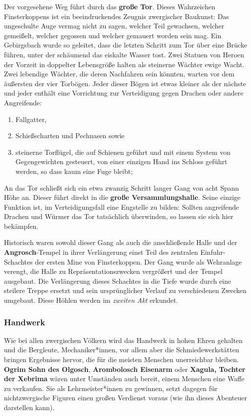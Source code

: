Der vorgesehene Weg führt durch das \textbf{große Tor}.
Dieses Wahrzeichen Finsterkoppens ist ein beeindruckendes Zeugnis zwergischer Baukunst:
Das ungeschulte Auge vermag nicht zu sagen, welcher Teil gewachsen, welcher gemeißelt, welcher gegossen und welcher gemauert worden sein mag.
Ein Gebirgsbach wurde so geleitet, dass die letzten Schritt zum Tor über eine Brücke führen, unter der schäumend das eiskalte Wasser tost.
Zwei Statuen von Heroen der Vorzeit in doppelter Lebensgröße halten als steinerne Wächter ewige Wacht.
Zwei lebendige Wächter, die deren Nachfahren sein könnten, warten vor dem äußersten der vier Torbögen.
Jeder dieser Bögen ist etwas kleiner als der nächste und  jeder enthält eine Vorrichtung zur Verteidigung gegen Drachen oder andere Angreifende:
\begin{enumerate}\setlength\itemsep {0em}
	\item Fallgatter,
	\item Schießscharten und Pechnasen sowie
	\item steinerne Torflügel, die auf Schienen geführt und mit einem System von Gegengewichten gesteuert, von einer einzigen Hand ins Schloss geführt werden, so dass kaum eine Fuge bleibt;
\end{enumerate}

An das Tor schließt sich ein etwa zwanzig Schritt langer Gang von acht Spann Höhe an.
Dieser führt direkt in die \textbf{große Versammlungshalle}.
Seine einzige Funktion ist, im Verteidigungsfall eine Engstelle zu bilden:
Sollten angreifende Drachen und Würmer das Tor tatsächlich überwinden, so lassen sie sich hier bekämpfen.

Historisch waren sowohl dieser Gang als auch die anschließende Halle und der \textbf{Angrosch}-Tempel in ihrer Verlängerung einst Teil des zentralen Einfuhr-Schachtes der ersten Mine von Finsterkoppen.
Der Gang wurde als Wehranlage verengt, die Halle zu Repräsentationszwecken vergrößert und der Tempel ausgebaut. 
Die Verlängerung dieses Schachtes in die Tiefe wurde durch eine steilere Treppe ersetzt und sein ursprünglicher Verlauf zu verschiedenen Zwecken umgebaut. Diese Höhlen werden im \emph{zweiten Akt} erkundet.

\subsubsection{Handwerk}
Wie bei allen zwergischen Völkern wird das Handwerk in hohen Ehren gehalten und die Bergleute, Mechaniker*innen, vor allem aber die Schmiedewerkstätten bringen Ergebnisse hervor, die für die meisten Menschen unerreichbar bleiben. \textbf{Ogrim Sohn des Olgosch}, \textbf{Arombolosch Eisenarm} oder \textbf{Xagula, Tochter der Xebrima} wären unter Umständen auch bereit, einem Menschen eine Waffe zu verkaufen.
Sie als Lehrmeister*innen zu gewinnen, setzt dagegen für nichtzwergische Figuren einen großen Verdienst voraus (wie ihn dieses Abenteuer darstellen kann).

